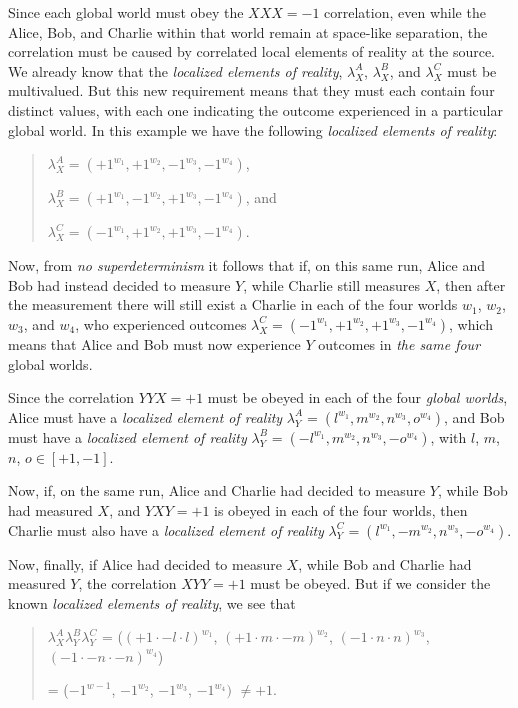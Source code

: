 \documentclass[a4paper]{article}
\begin{document}
Since each global world must obey the $XXX = -1$ correlation, even while the Alice, Bob, and Charlie within that world remain
at space-like separation, the correlation must be caused by correlated local elements of reality at the source. We already know that the \textit{localized elements of reality}, $\lambda_X^A$, $\lambda_X^B$, and $\lambda_X^C$ must be multivalued. But this new requirement means that they must each contain four distinct
values, with each one indicating the outcome experienced in a particular global world. In this example we have the following \textit{localized elements of reality}:

\begin{quote}
$\lambda_X^A = (+1^{w_1}, +1^{w_2}, -1^{w_3}, -1^{w_4})$, 

$\lambda_X^B = (+1^{w_1}, -1^{w_2}, +1^{w_3}, -1^{w_4})$, and

$\lambda_X^C = (-1^{w_1}, +1^{w_2}, +1^{w_3}, -1^{w_4})$.
\end{quote}

Now, from \textit{no superdeterminism} it follows that if, on this same run, Alice and Bob had instead decided to
measure $Y$, while Charlie still measures $X$, then after the measurement there will still exist a Charlie in each of the
four worlds $w_1$, $w_2$, $w_3$, and $w_4$, who experienced outcomes $\lambda_X^C = (-1^{w_1}, +1^{w_2}, +1^{w_3}, -1^{w_4})$, which means that Alice
and Bob must now experience $Y$ outcomes in \textit{the same four} global worlds.

Since the correlation $YYX = +1$ must be obeyed in each of the four \textit{global worlds}, Alice must have a \textit{localized element of reality} $\lambda_Y^A
= (l^{w_1}, m^{w_2}, n^{w_3}, o^{w_4})$, and Bob must have a \textit{localized element of reality} $\lambda_Y^B = (-l^{w_1}, m^{w_2}, n^{w_3}, -o^{w_4})$, with $l$, $m$, $n$, $o \in [+1,-1]$.

Now, if, on the same run, Alice and Charlie had decided to measure $Y$, while Bob had measured $X$, and $YXY = +1$ is obeyed in each of the four worlds, then Charlie must also have a \textit{localized element of reality} $\lambda_Y^C = (l^{w_1}, -m^{w_2}, n^{w_3}, -o^{w_4})$.

Now, finally, if Alice had decided to measure $X$, while Bob and Charlie had measured $Y$, the correlation $XYY = +1$ must be obeyed. But if we consider the known \textit{localized elements of reality}, we see that

\begin{quote}
$\lambda_X^A \lambda_Y^B \lambda_Y^C$ = ($ (+1 \cdot -l \cdot l)^{w_1}$, $(+1 \cdot m \cdot -m)^{w_2}$, $(-1 \cdot n \cdot n)^{w_3}$, $(-1 \cdot -n \cdot -n)^{w_4}$) 

= ($-1^{w-1}$, $-1^{w_2}$, $-1^{w_3}$, $-1^{w_4})$ $\neq +1$.
\end{quote}
\end{document}
